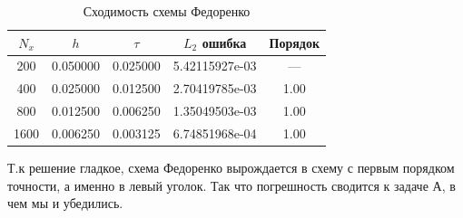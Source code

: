 \documentclass[12pt]{article}
\begin{document}
\begin{table}[H]
    \centering
    \caption{Сходимость схемы Федоренко}
    \label{tab:convergence_fedorenko}
    \begin{tabular}{|c|c|c|c|c|}
        \hline
        $N_x$ & $h$ & $\tau$ & $L_2$ ошибка & Порядок \\
        \hline
        200 & 0.050000 & 0.025000 & 5.42115927e-03 & --- \\
        \hline
        400 & 0.025000 & 0.012500 & 2.70419785e-03 & 1.00 \\
        \hline
        800 & 0.012500 & 0.006250 & 1.35049503e-03 & 1.00 \\
        \hline
        1600 & 0.006250 & 0.003125 & 6.74851968e-04 & 1.00 \\
        \hline
    \end{tabular}
\end{table}

Т.к решение гладкое, схема Федоренко вырождается в схему с первым порядком точности, а именно в левый уголок. Так что погрешность
сводится к задаче А, в чем мы и убедились.
\end{document}
